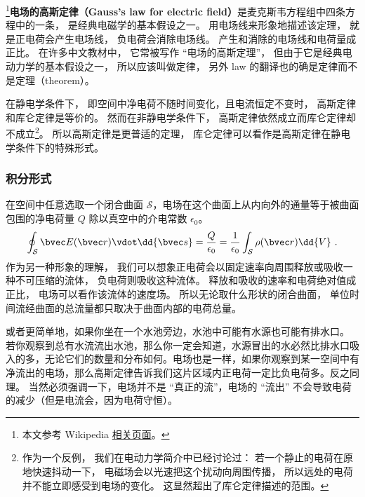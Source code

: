 

\footnote{本文参考 Wikipedia \href{https://en.wikipedia.org/wiki/Gauss's_law}{相关页面}。}\textbf{电场的高斯定律（Gauss's law for electric field）}是麦克斯韦方程组中四条方程中的一条， 是经典电磁学的基本假设之一。 用电场线来形象地描述该定理， 就是正电荷会产生电场线， 负电荷会消除电场线。 产生和消除的电场线和电荷量成正比。 在许多中文教材中， 它常被写作 “电场的高斯定理”， 但由于它是经典电动力学的基本假设之一， 所以应该叫做定律， 另外 law 的翻译也的确是定律而不是定理（theorem）。

在静电学条件下， 即空间中净电荷不随时间变化，且电流恒定不变时， 高斯定律和库仑定律是等价的。 然而在非静电学条件下， 高斯定律依然成立而库仑定律却不成立\footnote{作为一个反例， 我们在电动力学简介中已经讨论过： 若一个静止的电荷在原地快速抖动一下， 电磁场会以光速把这个扰动向周围传播， 所以远处的电荷并不能立即感受到电场的变化。 这显然超出了库仑定律描述的范围。}。 所以高斯定律是更普适的定理， 库仑定律可以看作是高斯定律在静电学条件下的特殊形式。

\subsubsection{积分形式}
在空间中任意选取一个闭合曲面 $\mathcal S$，电场在这个曲面上从内向外的通量等于被曲面包围的净电荷量 $Q$ 除以真空中的介电常数 $\epsilon_0$。
\begin{equation}\label{eq_EGauss_2}
\oint_{\mathcal S} \bvec E(\bvec r) \vdot \dd{\bvec s} = \frac{Q}{\epsilon_0} = \frac{1}{\epsilon_0} \int_{\mathcal S} \rho(\bvec r) \dd{V}~.
\end{equation}
作为另一种形象的理解， 我们可以想象正电荷会以固定速率向周围释放或吸收一种不可压缩的流体， 负电荷则吸收这种流体。 释放和吸收的速率和电荷绝对值成正比， 电场可以看作该流体的速度场。 所以无论取什么形状的闭合曲面， 单位时间流经曲面的总流量都只取决于曲面内部的电荷总量。

或者更简单地，如果你坐在一个水池旁边，水池中可能有水源也可能有排水口。 若你观察到总有水流流出水池，那么你一定会知道，水源冒出的水必然比排水口吸入的多，无论它们的数量和分布如何。电场也是一样，如果你观察到某一空间中有净流出的电场，那么高斯定律告诉我们这片区域内正电荷一定比负电荷多。反之同理。 当然必须强调一下，电场并不是 “真正的流”，电场的 “流出” 不会导致电荷的减少（但是电流会，因为电荷守恒）。

